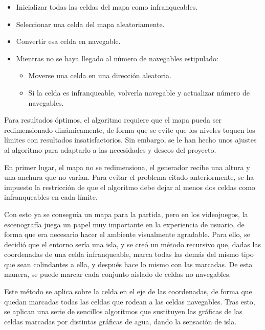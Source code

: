 		\begin{itemize}

			\item Inicializar todas las celdas del mapa como infranqueables.

			\item Seleccionar una celda del mapa aleatoriamente.

			\item Convertir esa celda en navegable.

			\item Mientras no se haya llegado al número de navegables estipulado:

			\begin{itemize}

				\item Moverse una celda en una dirección aleatoria.

				\item Si la celda es infranqueable, volverla navegable y actualizar número de navegables.

			\end{itemize}

		\end{itemize}

		Para resultados óptimos, el algoritmo requiere que el mapa pueda ser redimensionado dinámicamente, de forma que se evite que los niveles toquen los límites con resultados insatisfactorios. Sin embargo, se le han hecho unos ajustes al algoritmo para adaptarlo a las necesidades y deseos del proyecto.

		En primer lugar, el mapa no se redimensiona, el generador recibe una altura y una anchura que no varían. Para evitar el problema citado anteriormente, se ha impuesto la restricción de que el algoritmo debe dejar al menos dos celdas como infranqueables en cada límite.

		Con esto ya se conseguía un mapa para la partida, pero en los videojuegos, la escenografía juega un papel muy importante en la experiencia de usuario, de forma que era necesario hacer el ambiente visualmente agradable. Para ello, se decidió que el entorno sería una isla, y se creó un método recursivo que, dadas las coordenadas de una celda infranqueable, marca todas las demás del mismo tipo que sean colindantes a ella, y después hace lo mismo con las marcadas. De esta manera, se puede marcar cada conjunto aislado de celdas no navegables.

		Este método se aplica sobre la celda en el eje de las coordenadas, de forma que quedan marcadas todas las celdas que rodean a las celdas navegables. Tras esto, se aplican una serie de sencillos algoritmos que sustituyen las gráficas de las celdas marcadas por distintas gráficas de agua, dando la sensación de isla.

